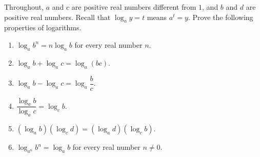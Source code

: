 Throughout, $a$ and $c$ are positive real numbers different from $1$, and $b$ and $d$ are positive real numbers. Recall that $\log_a y=t$ means $a^t=y$. Prove the following properties of logarithms.
\begin{enumerate}
\item[(a)] $\log_a b^n=n\log_a b$ for every real number $n$.
\item[(b)] $\log_a b+\log_a c=\log_a(bc)$.
\item[(c)] $\log_a b-\log_a c=\log_a\dfrac{b}{c}$.
\item[(d)] $\dfrac{\log_a b}{\log_a c}=\log_c b$.
\item[(e)] $\left(\log_a b\right)\left(\log_c d\right)=\left(\log_a d\right)\left(\log_c b\right)$.
\item[(f)] $\log_{a^n}b^n=\log_a b$ for every real number $n\ne0$.
\end{enumerate}
